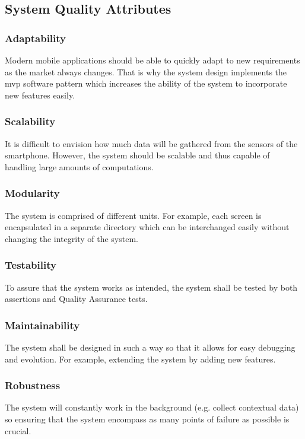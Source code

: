     \subsection{System Quality Attributes}
        
        \subsubsection{Adaptability}
        Modern mobile applications should be able to quickly adapt to new requirements as the market always changes. That is why the system design implements the \gls{mvp} software pattern which increases the ability of the system to incorporate new features easily.
        
        \subsubsection{Scalability}
        It is difficult to envision how much data will be gathered from the sensors of the smartphone. However, the system should be scalable and thus capable of handling large amounts of computations.
        
        \subsubsection{Modularity}
        The system is comprised of different units. For example, each screen is encapsulated in a separate directory which can be interchanged easily without changing the integrity of the system.  
        
        \subsubsection{Testability}
        To assure that the system works as intended, the system shall be tested by both assertions and Quality Assurance tests. 
        
        \subsubsection{Maintainability}
        The system shall be designed in such a way so that it allows for easy debugging and evolution. For example, extending the system by adding new features.
        
        \subsubsection{Robustness}
        The system will constantly work in the background (e.g. collect contextual data) so ensuring that the system encompass as many points of failure as possible is crucial.
    
    
    